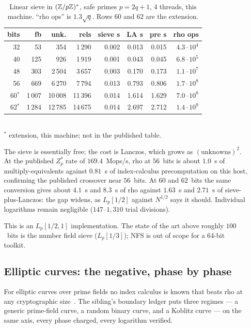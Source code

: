 \begin{table}[t]
\centering
\small
\caption{Linear sieve in $(\mathbb{Z}/p\mathbb{Z})^*$, safe primes $p=2q+1$, 4
  threads, this machine. ``rho ops'' is $1.3\sqrt{q}$. Rows $60$ and
  $62$ are the extension.}
\label{tab:ic-zp}
\begin{tabular}{@{}rrrrrrrr@{}}
\toprule
bits & fb & unk. & rels & sieve s & LA s & pre s & rho ops \\
\midrule
32 & 53 & 354 & 1\,290 & 0.002 & 0.013 & 0.015 & $4.3\cdot 10^{4}$ \\
40 & 125 & 926 & 1\,919 & 0.001 & 0.043 & 0.045 & $6.8\cdot 10^{5}$ \\
48 & 303 & 2\,504 & 3\,657 & 0.003 & 0.170 & 0.173 & $1.1\cdot 10^{7}$ \\
56 & 669 & 6\,270 & 7\,794 & 0.013 & 0.793 & 0.806 & $1.7\cdot 10^{8}$ \\
60$^*$ & 1\,007 & 10\,008 & 11\,396 & 0.014 & 1.614 & 1.629 & $7.0\cdot 10^{8}$ \\
62$^*$ & 1\,284 & 12\,785 & 14\,675 & 0.014 & 2.697 & 2.712 & $1.4\cdot 10^{9}$ \\
\bottomrule
\end{tabular}\\[0.3em]
{\footnotesize $^*$ extension, this machine; not in the published table.}
\end{table}

The sieve is essentially free; the cost is Lanczos, which grows as
$(\text{unknowns})^2$. At the published $Z_p^*$ rate of $169.4$~Mops/s,
rho at $56$~bits is about $1.0$~s of multiply-equivalents against
$0.81$~s of index-calculus precomputation on this host, confirming the
published crossover near $56$~bits. At $60$ and $62$~bits the same
conversion gives about $4.1$~s and $8.3$~s of rho against $1.63$~s and
$2.71$~s of sieve-plus-Lanczos: the gap widens, as $L_p[1/2]$ against
$N^{1/2}$ says it should. Individual logarithms remain negligible
($147$--$1{,}310$ trial divisions).

This is an $L_p[1/2,1]$ implementation. The state of the art above
roughly $100$~bits is the number field sieve ($L_p[1/3]$); NFS is out
of scope for a 64-bit toolkit.

\subsection{Elliptic curves: the negative, phase by phase}
\label{sec:ic-elliptic}

For elliptic curves over prime fields no index calculus is known that
beats rho at any cryptographic size~\cite{semaev2004,gaudry2009,diem2011}.
The sibling's boundary ledger puts three regimes --- a generic
prime-field curve, a random binary curve, and a Koblitz curve --- on
the same axis, every phase charged, every logarithm
verified.

